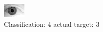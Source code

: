 \begin{figure}[h!]
\begin{center}
\includegraphics[width=0.60\columnwidth]{figures/ID2127_class_4_target_3.png}
\end{center}
\caption{ Classification: 4 actual target: 3}
\label{fig:ID2127_class_4_target_3}
\end{figure}
